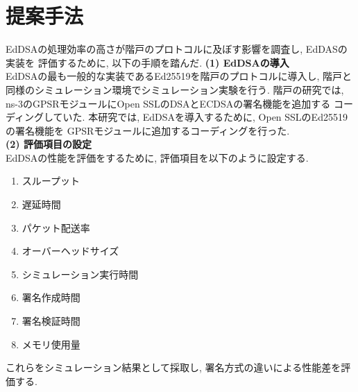 \documentclass[a4j,9pt,twocolumn]{jsarticle}
\begin{document}
\section{提案手法}
\indent EdDSAの処理効率の高さが階戸のプロトコルに及ぼす影響を調査し, EdDASの実装を
評価するために, 以下の手順を踏んだ. 
\noindent\textbf{(1) EdDSAの導入}\\
\indent EdDSAの最も一般的な実装であるEd25519を階戸のプロトコルに導入し, 
階戸と同様のシミュレーション環境でシミュレーション実験を行う. 
階戸の研究では, ns-3のGPSRモジュールにOpen SSLのDSAとECDSAの署名機能を追加する
コーディングしていた. 本研究では, EdDSAを導入するために, Open SSLのEd25519の署名機能を
GPSRモジュールに追加するコーディングを行った. \\
\noindent\textbf{(2) 評価項目の設定}\\
\indent EdDSAの性能を評価をするために, 評価項目を以下のように設定する. 
\vspace{-3mm}
\begin{multicols}{2}
    \begin{enumerate}
        \item スループット
        \item 遅延時間
        \item パケット配送率
        \item オーバーヘッドサイズ
        \item シミュレーション実行時間
        \item 署名作成時間
        \item 署名検証時間
        \item メモリ使用量
    \end{enumerate}
\end{multicols}
\vspace{-3mm}
これらをシミュレーション結果として採取し, 署名方式の違いによる性能差を評価する. 
\end{document}
